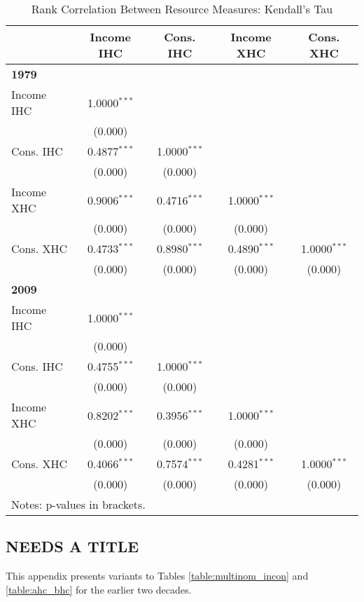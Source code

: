 \begin{table}[tp!]
\caption{Rank Correlation Between Resource Measures: Kendall's Tau}
\centering
\begin{tabular}{lcccc}
\hline\hline 	
 &  Income IHC & Cons. IHC & Income XHC & Cons. XHC \\
\hline
\multicolumn{5}{l}{\textbf{1979}}  \\
Income IHC &1.0000$^{***}$ & & & \\
 & (0.000)  & & & \\
Cons. IHC & 0.4877$^{***}$&1.0000$^{***}$ & & \\
 & (0.000) &(0.000) & & \\
Income XHC & 0.9006$^{***}$&0.4716$^{***}$ &1.0000$^{***}$ & \\
  & (0.000) &(0.000) & (0.000) & \\
Cons. XHC &0.4733$^{***}$ &0.8980$^{***}$ &0.4890$^{***}$ &1.0000$^{***}$ \\
 & (0.000) &(0.000) & (0.000) & (0.000) \\
\hline
\multicolumn{5}{l}{\textbf{2009}}  \\
Income IHC &1.0000$^{***}$ & & & \\
 & (0.000)  & & & \\
Cons. IHC & 0.4755$^{***}$&1.0000$^{***}$ & & \\
 & (0.000) &(0.000) & & \\
Income XHC & 0.8202$^{***}$&0.3956$^{***}$ &1.0000$^{***}$ & \\
  & (0.000) &(0.000) & (0.000) & \\
Cons. XHC &0.4066$^{***}$ &0.7574$^{***}$ &0.4281$^{***}$ &1.0000$^{***}$ \\
 & (0.000) &(0.000) & (0.000) & (0.000) \\
\hline\hline
\multicolumn{5}{l}{Notes: p-values in brackets. }
\end{tabular}
\label{table:kendall}
\end{table}


\subsection{NEEDS A TITLE}

This appendix presents variants to Tables \ref{table:multinom_incon} and \ref{table:ahc_bhc} for the earlier two decades.


